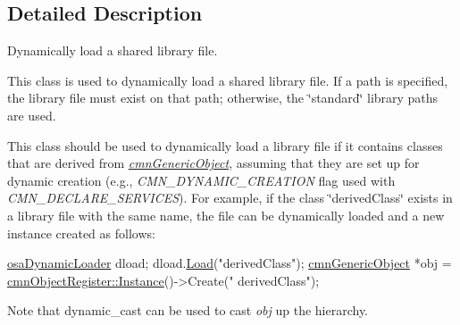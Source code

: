 \subsection{Detailed Description}
Dynamically load a shared library file. 

This class is used to dynamically load a shared library file. If a path is specified, the library file must exist on that path; otherwise, the \char`\"{}standard\char`\"{} library paths are used.

This class should be used to dynamically load a library file if it contains classes that are derived from {\itshape \hyperlink{classcmn_generic_object}{cmn\-Generic\-Object}}, assuming that they are set up for dynamic creation (e.\-g., {\itshape C\-M\-N\-\_\-\-D\-Y\-N\-A\-M\-I\-C\-\_\-\-C\-R\-E\-A\-T\-I\-O\-N} flag used with {\itshape C\-M\-N\-\_\-\-D\-E\-C\-L\-A\-R\-E\-\_\-\-S\-E\-R\-V\-I\-C\-E\-S}). For example, if the class \char`\"{}derived\-Class\char`\"{} exists in a library file with the same name, the file can be dynamically loaded and a new instance created as follows\-: 
\begin{DoxyCode}
\hyperlink{classosa_dynamic_loader}{osaDynamicLoader} dload;
dload.\hyperlink{classosa_dynamic_loader_a1a09c14de452798d15c2a7647c604fa7}{Load}(\textcolor{stringliteral}{"derivedClass"});
\hyperlink{classcmn_generic_object}{cmnGenericObject} *obj = \hyperlink{classcmn_object_register_a12ce3c182ea66df7bebf73f784c5770f}{cmnObjectRegister::Instance}()->Create(\textcolor{stringliteral}{"
      derivedClass"});
\end{DoxyCode}
 Note that {\ttfamily dynamic\-\_\-cast} can be used to cast {\itshape obj} up the hierarchy. 

